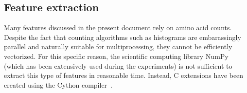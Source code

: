   \subsection{Feature extraction}

    Many features discussed in the present document rely on amino acid counts.
    Despite the fact that counting algorithms such as histograms are embarassingly parallel
    and naturally suitable for multiprocessing, they cannot be efficiently vectorized.
    For this specific reason, the scientific computing library NumPy (which has been extensively
    used during the experiments) is not sufficient to extract this type of features in reasonable
    time. Instead, C extensions have been created using the Cython compiler~\cite{behnel2010cython}.
